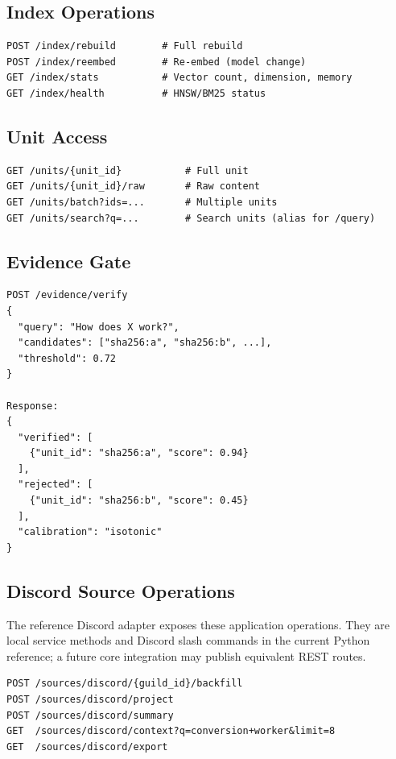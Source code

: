 \subsection{Index Operations}
\label{sec:api:index}

\begin{verbatim}
POST /index/rebuild        # Full rebuild
POST /index/reembed        # Re-embed (model change)
GET /index/stats           # Vector count, dimension, memory
GET /index/health          # HNSW/BM25 status
\end{verbatim}

\subsection{Unit Access}
\label{sec:api:unit}

\begin{verbatim}
GET /units/{unit_id}           # Full unit
GET /units/{unit_id}/raw       # Raw content
GET /units/batch?ids=...       # Multiple units
GET /units/search?q=...        # Search units (alias for /query)
\end{verbatim}

\subsection{Evidence Gate}
\label{sec:api:evidence}

\begin{verbatim}
POST /evidence/verify
{
  "query": "How does X work?",
  "candidates": ["sha256:a", "sha256:b", ...],
  "threshold": 0.72
}

Response:
{
  "verified": [
    {"unit_id": "sha256:a", "score": 0.94}
  ],
  "rejected": [
    {"unit_id": "sha256:b", "score": 0.45}
  ],
  "calibration": "isotonic"
}
\end{verbatim}

\subsection{Discord Source Operations}
\label{sec:api:discord}

The reference Discord adapter exposes these application operations. They are
local service methods and Discord slash commands in the current Python
reference; a future core integration may publish equivalent REST routes.

\begin{verbatim}
POST /sources/discord/{guild_id}/backfill
POST /sources/discord/project
POST /sources/discord/summary
GET  /sources/discord/context?q=conversion+worker&limit=8
GET  /sources/discord/export
\end{verbatim}

